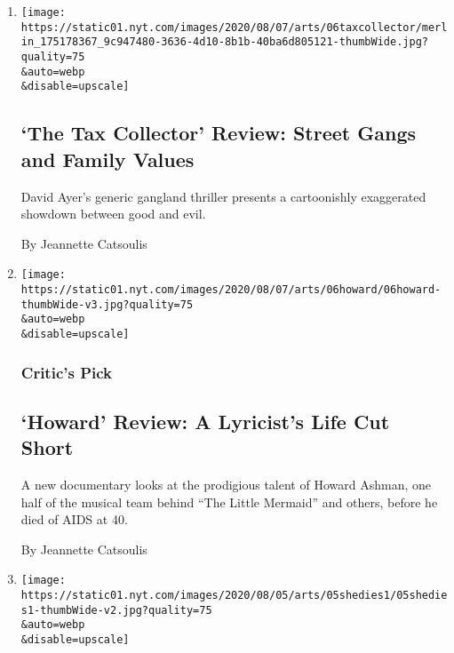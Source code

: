\begin{enumerate}
\def\labelenumi{\arabic{enumi}.}
\item
  \href{/2020/08/06/movies/the-tax-collector-review.html}{}

  \texttt{[image: https://static01.nyt.com/images/2020/08/07/arts/06taxcollector/merlin\_175178367\_9c947480-3636-4d10-8b1b-40ba6d805121-thumbWide.jpg?quality=75\\\&auto=webp\\\&disable=upscale]}

  \hypertarget{the-tax-collector-review-street-gangs-and-family-values}{%
  \subsection{`The Tax Collector' Review: Street Gangs and Family
  Values}\label{the-tax-collector-review-street-gangs-and-family-values}}

  David Ayer's generic gangland thriller presents a cartoonishly
  exaggerated showdown between good and evil.

  By Jeannette Catsoulis
\item
  \href{/2020/08/06/movies/howard-review.html}{}

  \texttt{[image: https://static01.nyt.com/images/2020/08/07/arts/06howard/06howard-thumbWide-v3.jpg?quality=75\\\&auto=webp\\\&disable=upscale]}

  \hypertarget{critics-pick}{%
  \subsubsection{Critic's Pick}\label{critics-pick}}

  \hypertarget{howard-review-a-lyricists-life-cut-short}{%
  \subsection{`Howard' Review: A Lyricist's Life Cut
  Short}\label{howard-review-a-lyricists-life-cut-short}}

  A new documentary looks at the prodigious talent of Howard Ashman, one
  half of the musical team behind ``The Little Mermaid'' and others,
  before he died of AIDS at 40.

  By Jeannette Catsoulis
\item
  \href{/2020/08/05/movies/she-dies-tomorrow-review.html}{}

  \texttt{[image: https://static01.nyt.com/images/2020/08/05/arts/05shedies1/05shedies1-thumbWide-v2.jpg?quality=75\\\&auto=webp\\\&disable=upscale]}


\end{enumerate}
